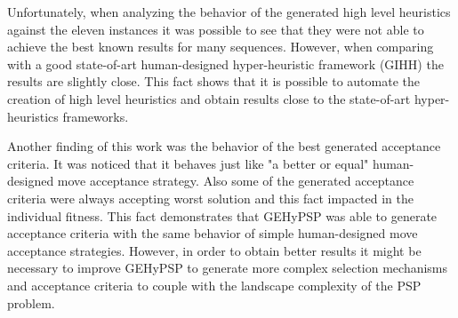 \documentclass[conference]{IEEEtran}
\begin{document}
Unfortunately, when analyzing the behavior of the generated high level heuristics against the eleven instances it was possible to see that they were not able to achieve the best known results for many sequences. However, when comparing with a good state-of-art human-designed hyper-heuristic framework (GIHH) \cite{misir2012intelligent} the results are slightly close. This fact shows that it is possible to automate the creation of high level heuristics and obtain results close to the state-of-art hyper-heuristics frameworks. 

 Another finding of this work was the behavior of the best generated acceptance criteria. It was noticed that it behaves just like "a better or equal" human-designed move acceptance strategy. Also some of the generated acceptance criteria were always accepting worst solution and this fact impacted in the individual fitness. This fact demonstrates that GEHyPSP was able to generate acceptance criteria with the same behavior of simple human-designed move acceptance strategies. However, in order to obtain better results it might be necessary to improve GEHyPSP to generate more complex selection mechanisms and acceptance criteria to couple with the landscape complexity of the PSP problem. 
 
 

 
  











%
%
%
	
	



\end{document}
